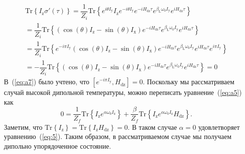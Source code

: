 \documentclass[utf8]{jetp}
\newcommand{\tr}[1]{\mathrm{Tr} \left\{ #1 \right\}}
\newcommand{\sx}{I_\mathrm{x}}
\newcommand{\sy}{I_\mathrm{y}}
\newcommand{\sz}{I_\mathrm{z}}
\newcommand{\hdz}{H_\mathrm{dz}}
\begin{document}
\begin{multline}
  \label{eq:a7}
  \tr{I_\mathrm{z} \sigma'(\tau)}
  = \dfrac{1}{Z_{i}} \tr{
    e^{i \theta \sy} \sz e^{-i \theta \sy}
    e^{-i \hdz \tau} e^{\beta_\mathrm{L} \omega_{0} \sy} e^{i \hdz \tau}
  }
  \\
  = \dfrac{1}{Z_i} \tr{
    \left( \cos(\theta) \sz - \sin(\theta) \sx \right)
    e^{-i \hdz \tau} e^{\beta_\mathrm{L} \omega_{0} \sy} e^{i \hdz \tau}
  }
  \\
  = \dfrac{1}{Z_i} \tr{
    e^{-i \pi \sy}
    \left( \cos(\theta) \sz - \sin(\theta) \sx \right)
    e^{-i \hdz \tau} e^{\beta_\mathrm{L} \omega_{0} \sy} e^{i \hdz \tau}
    e^{i \pi \sy}
  }
  \\
  = - \dfrac{1}{Z_i} \tr{
    \left( \cos(\theta) \sz - \sin(\theta) \sx \right)
    e^{-i \hdz \tau} e^{\beta_\mathrm{L} \omega_{0} \sy} e^{i \hdz \tau}
  } = 0
\end{multline}
%
В~(\ref{eq:a7}) было учтено, что $\left[ e^{-i \pi \sy}, \hdz \right] = 0$.
Поскольку мы рассматриваем случай высокой дипольной температуры, можно переписать уравнение~(\ref{eq:a5}) как
\begin{equation}
  \label{eq:a8}
  0 = \dfrac{1}{Z_f} \tr{ \sz e^{\alpha \omega_0 \sz}}
  + \dfrac{\beta}{Z_f} \tr{\sz e^{\alpha \omega_0 \sz} \hdz}.
\end{equation}
%
Заметим, что $\tr{\sz} = \tr{\sz\hdz} = 0$. 
В таком случае $\alpha = 0$ удовлетворяет уравнению~(\ref{eq:5}).
Таким образом, в рассматриваемом случае мы получаем дипольно упорядоченное состояние.


\end{document}
